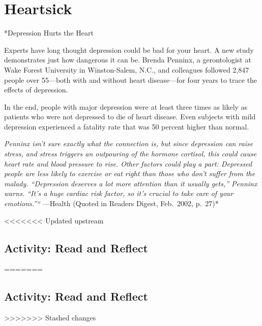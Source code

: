 \documentclass[
]{book}
\begin{document}
\hypertarget{heartsick}{%
\section{Heartsick}\label{heartsick}}

*Depression Hurts the Heart

Experts have long thought depression could be bad for your heart. A new study demonstrates just how dangerous it can be. Brenda Penninx, a gerontologist at Wake Forest University in Winston-Salem, N.C., and colleagues followed 2,847 people over 55---both with and without heart disease---for four years to trace the effects of depression.

In the end, people with major depression were at least three times as likely as patients who were not depressed to die of heart disease. Even subjects with mild depression experienced a fatality rate that was 50 percent higher than normal.

\emph{Penninx isn't sure exactly what the connection is, but since depression can raise stress, and stress triggers an outpouring of the hormone cortisol, this could cause heart rate and blood pressure to rise. Other factors could play a part: Depressed people are less likely to exercise or eat right than those who don't suffer from the malady. ``Depression deserves a lot more attention than it usually gets,'' Penninx warns. ``It's a huge cardiac risk factor, so it's crucial to take care of your emotions.''``} ---Health (Quoted in Readers Digest, Feb.~2002, p.~27)*

<<<<<<< Updated upstream
\hypertarget{activity-read-and-reflect-16}{%
\subsection*{Activity: Read and Reflect}\label{activity-read-and-reflect-16}}
=======
\hypertarget{activity-read-and-reflect-15}{%
\subsection*{Activity: Read and Reflect}\label{activity-read-and-reflect-15}}
>>>>>>> Stashed changes
\end{document}
